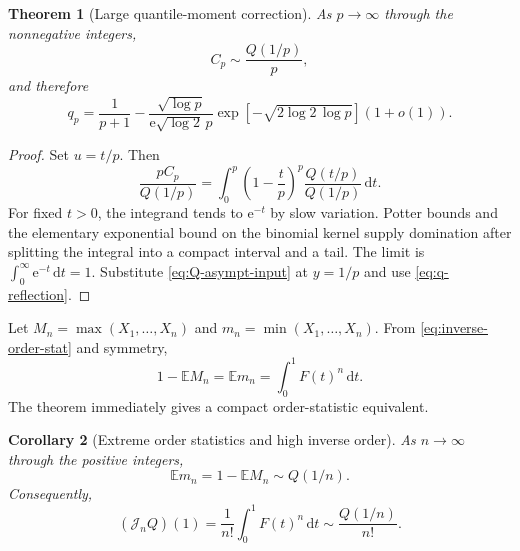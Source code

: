 \documentclass[11pt,oneside]{article}
\newtheorem{theorem}{Theorem}[section]
\newtheorem{corollary}[theorem]{Corollary}
\theoremstyle{definition}
\theoremstyle{remark}
\newcommand{\E}{\mathbb E}
\newcommand{\dd}{\,\mathrm d}
\newcommand{\e}{\mathrm e}
\newcommand{\Jn}{\mathcal J}
\newcommand{\1}{\mathbf 1}
\begin{document}
\begin{theorem}[Large quantile-moment correction]\label{thm:large-quantile}
As \(p\to\infty\) through the nonnegative integers,
\begin{equation}
 C_p\sim\frac{Q(1/p)}p,                                       \label{eq:Cp-asympt}
\end{equation}
and therefore
\begin{equation}
 \boxed{\quad
 q_p=\frac1{p+1}
 -\frac{\sqrt{\log p}}{\e\sqrt{\log2}\,p}
 \exp\!\left[-\sqrt{2\log2\,\log p}\right](1+o(1)).
 \quad}                                                        \label{eq:qp-asympt}
\end{equation}
\end{theorem}

\begin{proof}
Set \(u=t/p\).  Then
\[
 \frac{pC_p}{Q(1/p)}
 =\int_0^p\left(1-\frac tp\right)^p
 \frac{Q(t/p)}{Q(1/p)}\dd t.
\]
For fixed \(t>0\), the integrand tends to \(\e^{-t}\) by slow variation.
Potter bounds and the elementary exponential bound on the binomial kernel
supply domination after splitting the integral into a compact interval and a
tail.  The limit is \(\int_0^\infty\e^{-t}\dd t=1\).  Substitute
\eqref{eq:Q-asympt-input} at \(y=1/p\) and use
\eqref{eq:q-reflection}.
\end{proof}

Let \(M_n=\max(X_1,\ldots,X_n)\) and
\(m_n=\min(X_1,\ldots,X_n)\).  From
\eqref{eq:inverse-order-stat} and symmetry,
\begin{equation}
 1-\E M_n=\E m_n=\int_0^1F(t)^n\dd t.                           \label{eq:order-stat-id}
\end{equation}
The theorem immediately gives a compact order-statistic equivalent.

\begin{corollary}[Extreme order statistics and high inverse order]\label{cor:extreme-order}
As \(n\to\infty\) through the positive integers,
\begin{equation}
 \boxed{\quad
 \E m_n=1-\E M_n\sim Q(1/n).
 \quad}                                                        \label{eq:extreme-order-asympt}
\end{equation}
Consequently,
\begin{equation}
 (\Jn_nQ)(1)=\frac1{n!}\int_0^1F(t)^n\dd t
 \sim\frac{Q(1/n)}{n!}.                                       \label{eq:high-inverse-order}
\end{equation}
\end{corollary}
\end{document}
